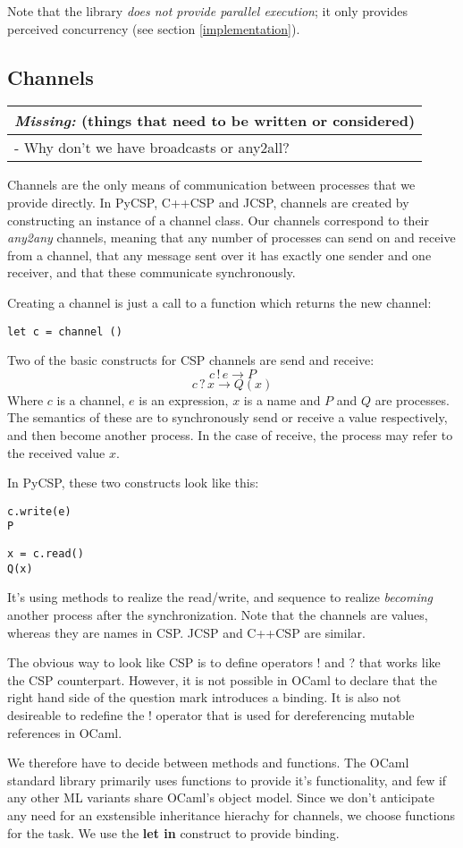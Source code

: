 \documentclass[a4paper,12pt]{article}
\newcommand{\missing}[1]{
\begin{tabular}{|p{11cm}|}
\hline
\emph{Missing:} {\scriptsize (things that need to be written or considered)} \\
\hline
#1
\hline
\end{tabular}
}
\begin{document}
Note that the library \emph{does not provide parallel execution}; it only provides 
perceived concurrency (see section \ref{implementation}).

\subsection{Channels}
\missing{
- Why don't we have broadcasts or any2all?\\
}

Channels are the only means of communication between processes that we provide directly.
In PyCSP, C++CSP and JCSP, channels are created by constructing an instance of a channel
class. Our channels correspond to their \emph{any2any} channels, meaning that any number
of processes can send on and receive from a channel, that any message sent over it
has exactly one sender and one receiver, and that these communicate synchronously.

Creating a channel is just a call to a function which returns the new channel:
\begin{verbatim}
let c = channel ()
\end{verbatim}

Two of the basic constructs for CSP channels are send and receive:
\[c\,!\,e \to P\]
\[c\,?\,x \to Q(x)\]
Where $c$ is a channel, $e$ is an expression, $x$ is a name and $P$ and $Q$ are processes. 
The semantics of these are to synchronously send or receive a value respectively, and
then become another process. In the case of receive, the process may refer to the
received value $x$.

In PyCSP, these two constructs look like this:
\begin{verbatim}
c.write(e)
P
\end{verbatim}
\begin{verbatim}
x = c.read()
Q(x)
\end{verbatim}
It's using methods to realize the read/write, and sequence to realize \emph{becoming}
another process after the synchronization. Note that the channels are values, whereas
they are names in CSP. JCSP and C++CSP are similar.

The obvious way to look like CSP is to define operators ! and ? that works like the
CSP counterpart. However, it is not possible in OCaml to declare that the right hand 
side of the question mark introduces a binding. It is also not desireable to redefine
the ! operator that is used for dereferencing mutable references in OCaml.

We therefore have to decide between methods and functions. The OCaml standard library
primarily uses functions to provide it's functionality, and few if any other ML 
variants share OCaml's object model. Since we don't anticipate any need for an
exstensible inheritance hierachy for channels, we choose functions for the task.
We use the \textbf{let in} construct to provide binding.
\end{document}
